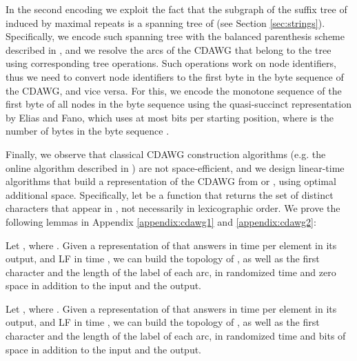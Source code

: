\documentclass[a4paper,UKenglish]{lipics-v2016}
\begin{document}
In the second encoding we exploit the fact that the subgraph of the suffix tree of  induced by maximal repeats is a spanning tree of  (see Section \ref{sec:strings}). Specifically, we encode such spanning tree with the balanced parenthesis scheme described in \cite{Munro01}, and we resolve the arcs of the CDAWG that belong to the tree using corresponding tree operations. Such operations work on node identifiers, thus we need to convert node identifiers to the first byte in the byte sequence of the CDAWG, and vice versa. For this, we encode the monotone sequence of the first byte of all  nodes in the byte sequence using the quasi-succinct representation by Elias and Fano, which uses at most  bits per starting position, where  is the number of bytes in the byte sequence \cite{elias1975complexity}.

Finally, we observe that classical CDAWG construction algorithms (e.g. the online algorithm described in \cite{CrochemoreV97}) are not space-efficient, and we design linear-time algorithms that build a representation of the CDAWG from  or , using optimal additional space. Specifically, let  be a function that returns the set of distinct characters that appear in , not necessarily in lexicographic order. We prove the following lemmas in Appendix \ref{appendix:cdawg1} and \ref{appendix:cdawg2}:

\begin{lemma} \label{lemma:cdawg1}
Let , where . Given a representation of  that answers  in time  per element in its output, and LF in time , we can build the topology of , as well as the first character and the length of the label of each arc, in randomized  time and zero space in addition to the input and the output. 
\end{lemma}

\begin{lemma} \label{lemma:cdawg2}
Let , where . Given a representation of  that answers  in time  per element in its output, and LF in time , we can build the topology of , as well as the first character and the length of the label of each arc, in randomized  time and  bits of space in addition to the input and the output.
\end{lemma}
\end{document}
